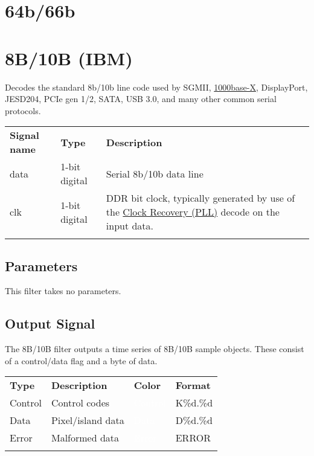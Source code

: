 \section{64b/66b}

\pagebreak
\section{8B/10B (IBM)}
\label{proto:8b10b}

Decodes the standard 8b/10b line code used by SGMII, \hyperref[proto:1000basex]{1000base-X}, DisplayPort, JESD204,
PCIe gen 1/2, SATA, USB 3.0, and many other common serial protocols.

\begin{tabularx}{16cm}{llX}
\thickhline
\textbf{Signal name} & \textbf{Type} & \textbf{Description} \\
\thickhline
data & 1-bit digital & Serial 8b/10b data line \\
\thickhline
clk & 1-bit digital & DDR bit clock, typically generated by use of the \hyperref[filter:cdrpll]{Clock Recovery
(PLL)} decode on the input data.\\
\thickhline
\end{tabularx}

\subsection{Parameters}

This filter takes no parameters.

\subsection{Output Signal}

The 8B/10B filter outputs a time series of 8B/10B sample objects. These consist of a control/data flag and a byte of
data.

\begin{tabularx}{16cm}{lllX}
\thickhline
\textbf{Type} & \textbf{Description} & \textbf{Color} & \textbf{Format} \\
\thickhline
Control & Control codes & \cellcolor{control}\textcolor{white}{Control} & K\%d.\%d \\
\thickhline
Data & Pixel/island data & \cellcolor{data}\textcolor{white}{Data} & D\%d.\%d \\
\thickhline
Error & Malformed data & \cellcolor{error}\textcolor{white}{Error} & ERROR \\
\thickhline
\end{tabularx}

